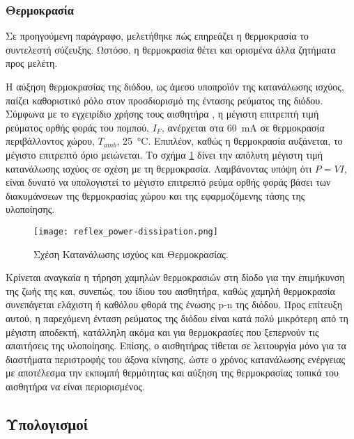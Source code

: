 \subsubsection{Θερμοκρασία}

Σε προηγούμενη παράγραφο, μελετήθηκε πώς επηρεάζει η θερμοκρασία το συντελεστή
σύζευξης. Ωστόσο, η θερμοκρασία θέτει και ορισμένα άλλα ζητήματα προς μελέτη.

Η αύξηση θερμοκρασίας της διόδου, ως άμεσο υποπροϊόν της κατανάλωσης ισχύος,
παίζει καθοριστικό ρόλο στον προσδιορισμό της έντασης ρεύματος της διόδου.
Σύμφωνα με το εγχειρίδιο χρήσης τους αισθητήρα \parencite{vishay09}, η μέγιστη
επιτρεπτή τιμή ρεύματος ορθής φοράς του πομπού, $I_F$, ανέρχεται στα 60~mA σε
θερμοκρασία περιβάλλοντος χώρου, $T_{amb}$, 25~°C. Επιπλέον, καθώς η θερμοκρασία
αυξάνεται, το μέγιστο επιτρεπτό όριο μειώνεται.
Το σχήμα \ref{fig:reflex:power-dissipation} δίνει την απόλυτη μέγιστη τιμή
κατανάλωσης ισχύος σε σχέση με τη θερμοκρασία. Λαμβάνοντας υπόψη ότι $P = VI$,
είναι δυνατό να υπολογιστεί το μέγιστο επιτρεπτό ρεύμα ορθής φοράς βάσει των
διακυμάνσεων της θερμοκρασίας χώρου και της εφαρμοζόμενης τάσης της υλοποίησης.

\begin{figure}
    \caption{Σχέση Κατανάλωσης ισχύος και Θερμοκρασίας.
    \label{fig:reflex:power-dissipation}}
    \begin{center}%
    \texttt{[image: reflex\_power-dissipation.png]}
    \end{center}

\end{figure}

Κρίνεται αναγκαία η τήρηση χαμηλών θερμοκρασιών στη δίοδο για την επιμήκυνση της
ζωής της και, συνεπώς, του ίδιου του αισθητήρα, καθώς χαμηλή θερμοκρασία
συνεπάγεται ελάχιστη ή καθόλου φθορά της ένωσης p-n της διόδου. Προς επίτευξη
αυτού, η παρεχόμενη ένταση ρεύματος της διόδου είναι κατά πολύ μικρότερη από τη
μέγιστη αποδεκτή, κατάλληλη ακόμα και για θερμοκρασίες που ξεπερνούν τις
απαιτήσεις της υλοποίησης. Επίσης, ο αισθητήρας τίθεται σε λειτουργία μόνο για
τα διαστήματα περιστροφής του άξονα κίνησης, ώστε ο χρόνος κατανάλωσης ενέργειας
με αποτέλεσμα την εκπομπή θερμότητας και αύξηση της θερμοκρασίας τοπικά του
αισθητήρα να είναι περιορισμένος.

\subsection{Υπολογισμοί}

